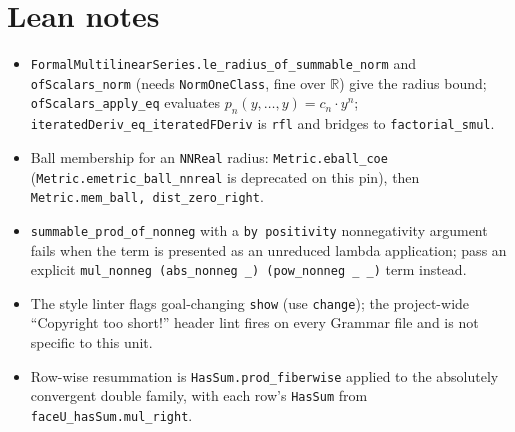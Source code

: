 \documentclass[11pt]{article}
\begin{document}
\section{Lean notes}
\begin{itemize}
\item \texttt{FormalMultilinearSeries.le\_radius\_of\_summable\_norm} and
\texttt{ofScalars\_norm} (needs \texttt{NormOneClass}, fine over $\mathbb R$) give the radius
bound; \texttt{ofScalars\_apply\_eq} evaluates $p_n(y,\dots,y)=c_n\cdot y^n$;
\texttt{iteratedDeriv\_eq\_iteratedFDeriv} is \texttt{rfl} and bridges to \texttt{factorial\_smul}.
\item Ball membership for an \texttt{NNReal} radius: \texttt{Metric.eball\_coe}
(\texttt{Metric.emetric\_ball\_nnreal} is deprecated on this pin), then
\texttt{Metric.mem\_ball, dist\_zero\_right}.
\item \texttt{summable\_prod\_of\_nonneg} with a \texttt{by positivity} nonnegativity argument fails
when the term is presented as an unreduced lambda application; pass an explicit
\texttt{mul\_nonneg (abs\_nonneg \_) (pow\_nonneg \_ \_)} term instead.
\item The style linter flags goal-changing \texttt{show} (use \texttt{change}); the project-wide
``Copyright too short!'' header lint fires on every Grammar file and is not specific to this unit.
\item Row-wise resummation is \texttt{HasSum.prod\_fiberwise} applied to the absolutely convergent
double family, with each row's \texttt{HasSum} from \texttt{faceU\_hasSum.mul\_right}.
\end{itemize}
\end{document}
